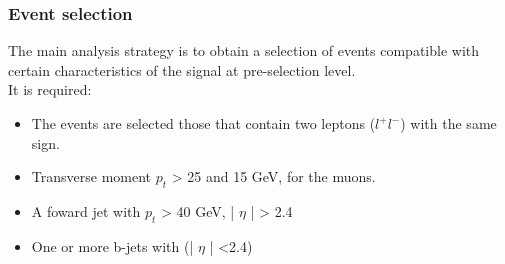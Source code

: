 \documentclass[11pt]{beamer}
\begin{document}
\begin{frame}
\frametitle{Event selection}
The main analysis strategy is to obtain a selection of events compatible with
certain characteristics of the signal at pre-selection level.\\

It is required:
\begin{itemize}
\item The events are selected those that contain two leptons ($l^+l^-$)  with the same sign.
\item Transverse moment $p_{t}$ > 25 and 15 GeV, for the muons.
\item A foward jet with $p_t$ > 40 GeV, | $\eta$ | > 2.4
\item One or more b-jets with (| $\eta$ | <2.4)\cite{1}
\end{itemize}
\end{frame}
\end{document}
